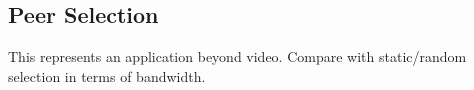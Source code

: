 \documentclass[10pt,twocolumn]{article}
\begin{document}
\subsection{Peer Selection}
This represents an application beyond video. Compare with static/random selection in terms of bandwidth.

{\scriptsize


}


%
\end{document}
